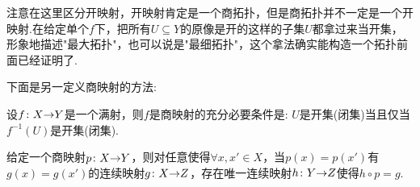 注意在这里区分开映射，开映射肯定是一个商拓扑，但是商拓扑并不一定是一个开映射.在给定单个$f$下，把所有$U \subseteq Y$的原像是开的这样的子集$U$都拿过来当开集，形象地描述"最大拓扑"，也可以说是"最细拓扑"，这个拿法确实能构造一个拓扑前面已经证明了.

下面是另一定义商映射的方法:
\begin{proposition}
设${f}\colon{X}{\to}{Y}$是一个满射，则$f$是商映射的充分必要条件是: $U$是开集(闭集)当且仅当$f^{-1}(U)$是开集(闭集).
\end{proposition}

\begin{proposition}
给定一个商映射${p}\colon{X}{\to}{Y}$，则对任意使得$\forall x,x' \in X$，当$p(x)=p(x')$有$g(x)=g(x')$的连续映射${g}\colon{X}{\to}{Z}$，存在唯一连续映射${h}\colon{Y}{\to}{Z}$使得$h \circ p =g$.
\begin{center}
\end{center}
\end{proposition}

